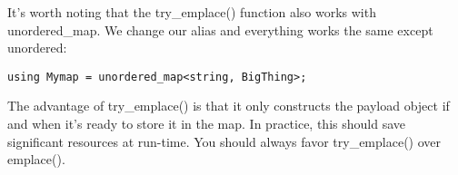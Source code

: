 It's worth noting that the try\_emplace() function also works with unordered\_map.
We change our alias and everything works the same except unordered:

\begin{lstlisting}[style=styleCXX]
using Mymap = unordered_map<string, BigThing>;
\end{lstlisting}

The advantage of try\_emplace() is that it only constructs the payload object if and when it's ready to store it in the map. In practice, this should save significant resources at run-time. You should always favor try\_emplace() over emplace().




















